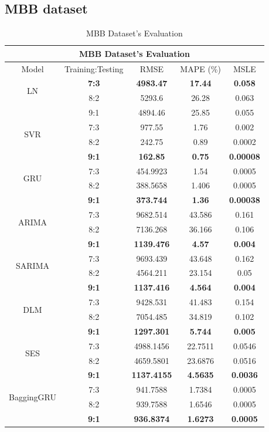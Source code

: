 \documentclass{ieeeojies}
\begin{document}
\subsection{MBB dataset} 
\begin{table}[H]
    \centering
    \begin{tabular}{|c|c|c|c|c|}
         \hline
         \multicolumn{5}{|c|}{\textbf{MBB Dataset's Evaluation}}\\
         \hline
         \centering Model & Training:Testing & RMSE & MAPE (\%) & MSLE\\
         \hline
         \multirow{2}{*}{LN} & \textbf{7:3}&\textbf{4983.47}&\textbf{17.44}&\textbf{0.058} \\ & 8:2 &  5293.6 & 26.28 & 0.063 \\ & 9:1&4894.46&25.85&0.055\\
         \hline
         \multirow{2}{*}{SVR} & 7:3&977.55&1.76&0.002 \\ & 8:2&242.75&0.89&0.0002 \\ & \textbf{9:1} & \textbf{162.85} & \textbf{0.75} & \textbf{0.00008}\\
         \hline
         \multirow{2}{*}{GRU} & 7:3&454.9923&1.54&0.0005 \\ &  8:2&388.5658&1.406&	0.0005 \\ & \textbf{9:1} & \textbf{373.744} & \textbf{1.36} & \textbf{0.00038}\\
         \hline
         \multirow{2}{*}{ARIMA} & 7:3 & 9682.514 & 43.586 & 0.161 \\ & 8:2 & 7136.268 & 36.166 & 0.106 \\ & \textbf{9:1} & \textbf{1139.476} & \textbf{4.57} & \textbf{0.004}\\
         \hline
         \multirow{2}{*}{SARIMA} & 7:3 & 9693.439 & 43.648&0.162 \\ &8:2 & 4564.211 & 23.154 & 0.05 \\ &  \textbf{9:1} &  \textbf{1137.416} &  \textbf{4.564} &  \textbf{0.004}\\
         \hline
         \multirow{2}{*}{DLM} & 7:3 & 9428.531 & 41.483 & 0.154 \\ & 8:2 & 7054.485 & 34.819 & 0.102\\ & \textbf{9:1} & \textbf{1297.301} & \textbf{5.744} & \textbf{0.005}\\
         \hline
         \multirow{2}{*}{SES} & 7:3 &  4988.1456 & 22.7511 & 0.0546 \\ & 8:2 & 4659.5801 & 23.6876 & 0.0516 \\ & \textbf{9:1} &  \textbf{1137.4155} &	\textbf{4.5635} & 	\textbf{0.0036} \\
         \hline
         \multirow{2}{*}{BaggingGRU} & 7:3 & 941.7588 &  1.7384 &  0.0005 \\ & 8:2 & 939.7588 &  1.6546 &  0.0005 \\ & \textbf{9:1} & \textbf{936.8374} & \textbf{1.6273} & \textbf{0.0005}\\
         \hline
    \end{tabular}
    \caption{MBB Dataset's Evaluation}
    \label{mbbresult}
\end{table}
\end{document}
